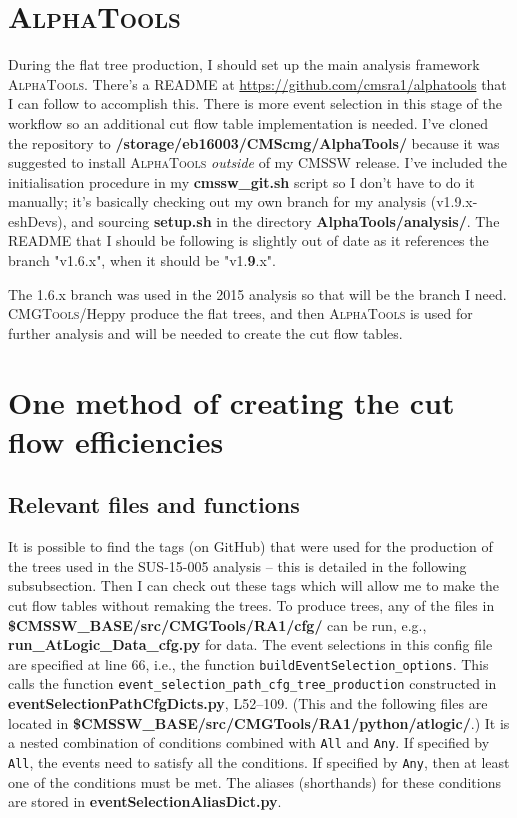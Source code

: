 \section{\textsc{AlphaTools}}

During the flat tree production, I should set up the main analysis framework \textsc{AlphaTools}. There's a README at \url{https://github.com/cmsra1/alphatools} that I can follow to accomplish this. There is more event selection in this stage of the workflow so an additional cut flow table implementation is needed. I've cloned the repository to \textbf{/storage/eb16003/CMScmg/AlphaTools/} because it was suggested to install \textsc{AlphaTools} \emph{outside} of my CMSSW release. I've included the initialisation procedure in my \textbf{cmssw\_git.sh} script so I don't have to do it manually; it's basically checking out my own branch for my analysis (v1.9.x-eshDevs), and sourcing \textbf{setup.sh} in the directory \textbf{AlphaTools/analysis/}. The README that I should be following is slightly out of date as it references the branch "v1.6.x", when it should be "v1.\textbf{9}.x". 

The 1.6.x branch was used in the 2015 analysis so that will be the branch I need. \textsc{CMGTools}/Heppy produce the flat trees, and then \textsc{AlphaTools} is used for further analysis and will be needed to create the cut flow tables.

\section{One method of creating the cut flow efficiencies}

\subsection{Relevant files and functions}

It is possible to find the tags (on GitHub) that were used for the production of the trees used in the SUS-15-005 analysis -- this is detailed in the following subsubsection. Then I can check out these tags which will allow me to make the cut flow tables without remaking the trees. To produce trees, any of the files in \textbf{\$CMSSW\_BASE/src/CMGTools/RA1/cfg/} can be run, e.g., \textbf{run\_AtLogic\_Data\_cfg.py} for data. The event selections in this config file are specified at line 66, i.e., the function \texttt{buildEventSelection\_options}. This calls the function \texttt{event\_selection\_path\_cfg\_tree\_production} constructed in \textbf{eventSelectionPathCfgDicts.py}, L52--109. (This and the following files are located in \textbf{\$CMSSW\_BASE/src/CMGTools/RA1/python/atlogic/}.) It is a nested combination of conditions combined with \verb!All! and \verb!Any!. If specified by \verb!All!, the events need to satisfy all the conditions. If specified by \verb!Any!, then at least one of the conditions must be met. The aliases (shorthands) for these conditions are stored in \textbf{eventSelectionAliasDict.py}.

